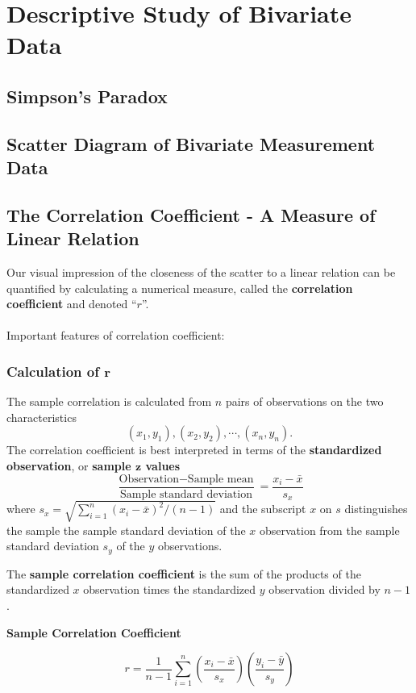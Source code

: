 \documentclass[12pt,a4paper]{article}
\begin{document}
\section{Descriptive Study of Bivariate Data}

\subsection{Simpson's Paradox}

\subsection{Scatter Diagram of Bivariate Measurement Data}

\subsection{The Correlation Coefficient - A Measure of Linear Relation}
Our visual impression of the closeness of the scatter to a linear relation can be quantified by calculating a numerical measure, called the \textbf{correlation coefficient} and denoted ``$r$''.\\
\\
Important features of correlation coefficient:

\subsubsection{Calculation of $\boldsymbol{r}$}
The sample correlation is calculated from $n$ pairs of observations on the two characteristics \[
(x_1, y_1), (x_2, y_2), \cdots, (x_n, y_n).
\] The correlation coefficient is best interpreted in terms of the \textbf{standardized observation}, or \textbf{sample $\boldsymbol{z}$ values} \[
\frac{\text{Observation}-\text{Sample mean}}{\text{Sample standard deviation}} = \frac{x_i-\bar{x}}{s_x}
\] where $s_x=\sqrt{\sum_{i=1}^n(x_i-\bar{x})^2/(n-1)}$ and the subscript $x$ on $s$ distinguishes the sample the sample standard deviation of the $x$ observation from the sample standard deviation $s_y$ of the $y$ observations.\par
The \textbf{sample correlation coefficient} is the sum of the products of the standardized $x$ observation times the standardized $y$ observation divided by $n-1$.
\begin{tcolorbox}[colback=white]\begin{center}
		\textbf{Sample Correlation Coefficient}
	\end{center} \[
	r=\frac{1}{n-1}\sum_{i=1}^n\left(\frac{x_i-\bar{x}}{s_x}\right)\left(\frac{y_i-\bar{y}}{s_y}\right)
\]	
\end{tcolorbox}
\end{document}
